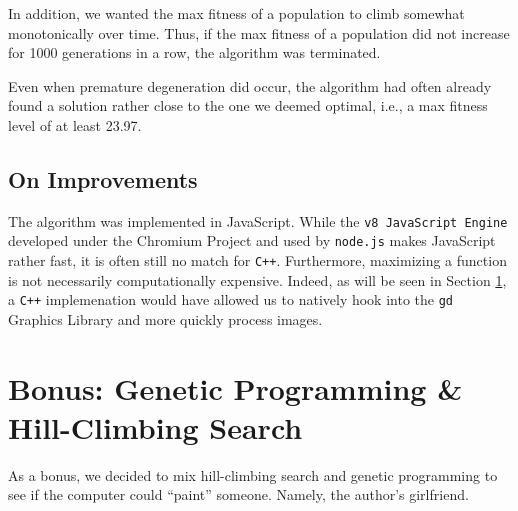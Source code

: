 \documentclass{article}
\begin{document}
    In addition, we wanted the max fitness of a
    population to climb somewhat monotonically over time. Thus, if the max
    fitness of a population did not increase for \num{1000} generations in a
    row, the algorithm was terminated.

    Even when premature degeneration did occur, the algorithm had often already
    found a solution rather close to the one we deemed optimal, i.e., a max
    fitness level of at least \num{23.97}.

  \subsection{On Improvements}
    The algorithm was implemented in JavaScript. While the \texttt{v8 JavaScript
    Engine} developed under the Chromium Project and used by \texttt{node.js}
    makes JavaScript rather fast, it is often still no match for \texttt{C++}.
    Furthermore, maximizing a function is not necessarily computationally
    expensive. Indeed, as will be seen in Section \ref{BONUS}, a \texttt{C++}
    implemenation would have allowed us to natively hook into the \texttt{gd}
    Graphics Library and more quickly process images.

\section{Bonus: Genetic Programming \& Hill-Climbing Search}\label{BONUS}
  As a bonus, we decided to mix hill-climbing search and genetic programming to
  see if the computer could ``paint'' someone. Namely, the author's girlfriend.
  
\end{document}
